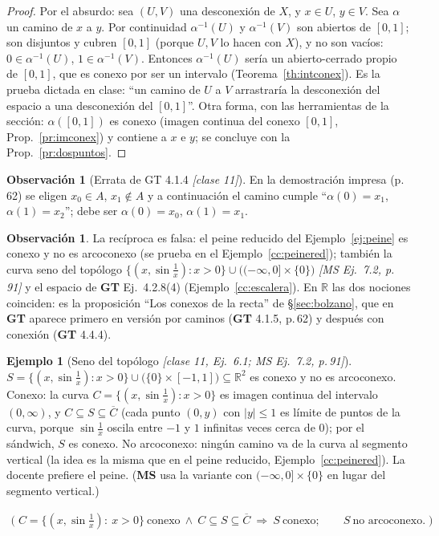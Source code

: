 \documentclass[11pt,a4paper]{article}
\newcommand{\lgc}[1]{\par\vspace{-3pt}\begin{gather*}\big(\;#1\;\big)\end{gather*}\vspace{-6pt}}
\theoremstyle{definition}
\newtheorem{ejemplo}[definicion]{Ejemplo}
\newtheorem{observacion}[definicion]{Observación}
\theoremstyle{plain}
\newcommand{\fnt}[1]{{\normalfont\small\itshape\color{gray!150!black}[#1]}}
\newcommand{\R}{\mathbb{R}}
\newcommand{\cl}[1]{\overline{#1}}
\begin{document}
\begin{proof}
Por el absurdo: sea $(U,V)$ una desconexión de $X$, y $x\in U$, $y\in V$. Sea $\alpha$ un camino de $x$ a $y$. Por continuidad $\alpha^{-1}(U)$ y $\alpha^{-1}(V)$ son abiertos de $[0,1]$; son disjuntos y cubren $[0,1]$ (porque $U,V$ lo hacen con $X$), y no son vacíos: $0\in\alpha^{-1}(U)$, $1\in\alpha^{-1}(V)$. Entonces $\alpha^{-1}(U)$ sería un abierto-cerrado propio de $[0,1]$, que es conexo por ser un intervalo (Teorema~\ref{th:intconex}). Es la prueba dictada en clase: ``un camino de $U$ a $V$ arrastraría la desconexión del espacio a una desconexión del $[0,1]$''.
Otra forma, con las herramientas de la sección: $\alpha([0,1])$ es conexo (imagen continua del conexo $[0,1]$, Prop.~\ref{pr:imconex}) y contiene a $x$ e $y$; se concluye con la Prop.~\ref{pr:dospuntos}.
\end{proof}

\begin{observacion}[Errata de GT 4.1.4 \fnt{clase 11}]
En la demostración impresa (p.\,62) se eligen $x_0\in A$, $x_1\notin A$ y a continuación el camino cumple ``$\alpha(0)=x_1$, $\alpha(1)=x_2$''; debe ser $\alpha(0)=x_0$, $\alpha(1)=x_1$.
\end{observacion}

\begin{observacion}
La recíproca es falsa: el peine reducido del Ejemplo~\ref{ej:peine} es conexo y no es arcoconexo (se prueba en el Ejemplo~\ref{cc:peinered}); también la curva seno del topólogo $\{(x,\sin\frac1x):x>0\}\cup\big((-\infty,0]\times\{0\}\big)$ \fnt{MS Ej.\ 7.2, p.\,91} y el espacio de \textbf{GT} Ej.\ 4.2.8(4) (Ejemplo~\ref{cc:escalera}). En $\R$ las dos nociones coinciden: es la proposición ``Los conexos de la recta'' de \S\ref{sec:bolzano}, que en \textbf{GT} aparece primero en versión por caminos (\textbf{GT} 4.1.5, p.\,62) y después con conexión (\textbf{GT} 4.4.4).
\end{observacion}

\begin{ejemplo}[Seno del topólogo \fnt{clase 11, Ej.\ 6.1; MS Ej.\ 7.2, p.\,91}]\label{cc:seno}
$S=\{(x,\sin\tfrac1x): x>0\}\cup\big(\{0\}\times[-1,1]\big)\subseteq\R^2$ es conexo y no es arcoconexo. Conexo: la curva $C=\{(x,\sin\frac1x):x>0\}$ es imagen continua del intervalo $(0,\infty)$, y $C\subseteq S\subseteq\cl C$ (cada punto $(0,y)$ con $|y|\le1$ es límite de puntos de la curva, porque $\sin\frac1x$ oscila entre $-1$ y $1$ infinitas veces cerca de $0$); por el sándwich, $S$ es conexo. No arcoconexo: ningún camino va de la curva al segmento vertical (la idea es la misma que en el peine reducido, Ejemplo~\ref{cc:peinered}). La docente prefiere el peine. (\textbf{MS} usa la variante con $(-\infty,0]\times\{0\}$ en lugar del segmento vertical.)
\lgc{C=\{(x,\sin\tfrac1x):\ x>0\}\ \text{conexo}\ \wedge\ C\subseteq S\subseteq\cl C\ \Rightarrow\ S\ \text{conexo};\qquad S\ \text{no arcoconexo}.}
\end{ejemplo}
\end{document}
